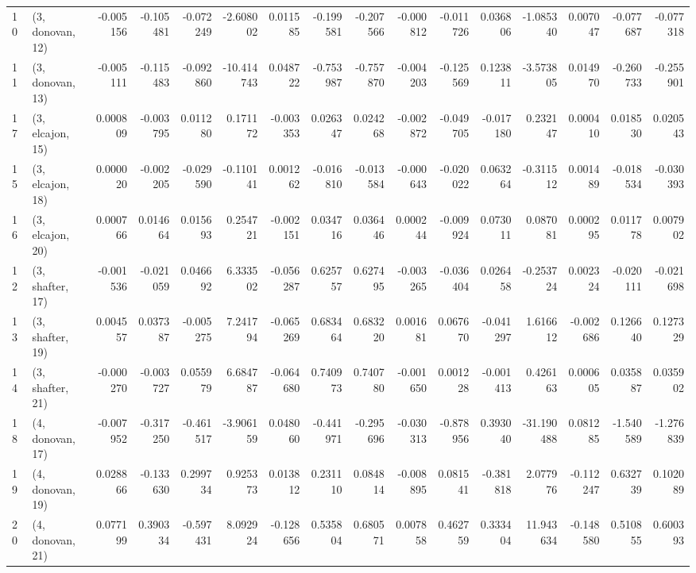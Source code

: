 \begin{tabular}{llrrrrrrrrrrrrrr}
10 &  (3, donovan, 12) &  -0.005156 & -0.105481 & -0.072249 &  -2.608002 &  0.011585 &  -0.199581 & -0.207566 & -0.000812 & -0.011726 &  0.036806 &  -1.085340 &  0.007047 & -0.077687 & -0.077318 \\
11 &  (3, donovan, 13) &  -0.005111 & -0.115483 & -0.092860 & -10.414743 &  0.048722 &  -0.753987 & -0.757870 & -0.004203 & -0.125569 &  0.123811 &  -3.573805 &  0.014970 & -0.260733 & -0.255901 \\
17 &  (3, elcajon, 15) &   0.000809 & -0.003795 &  0.011280 &   0.171172 & -0.003353 &   0.026347 &  0.024268 & -0.002872 & -0.049705 & -0.017180 &   0.232147 &  0.000410 &  0.018530 &  0.020543 \\
15 &  (3, elcajon, 18) &   0.000020 & -0.002205 & -0.029590 &  -0.110141 &  0.001262 &  -0.016810 & -0.013584 & -0.000643 & -0.020022 &  0.063264 &  -0.311512 &  0.001489 & -0.018534 & -0.030393 \\
16 &  (3, elcajon, 20) &   0.000766 &  0.014664 &  0.015693 &   0.254721 & -0.002151 &   0.034716 &  0.036446 &  0.000244 & -0.009924 &  0.073011 &   0.087081 &  0.000295 &  0.011778 &  0.007902 \\
12 &  (3, shafter, 17) &  -0.001536 & -0.021059 &  0.046692 &   6.333502 & -0.056287 &   0.625757 &  0.627495 & -0.003265 & -0.036404 &  0.026458 &  -0.253724 &  0.002324 & -0.020111 & -0.021698 \\
13 &  (3, shafter, 19) &   0.004557 &  0.037387 & -0.005275 &   7.241794 & -0.065269 &   0.683464 &  0.683220 &  0.001681 &  0.067670 & -0.041297 &   1.616612 & -0.002686 &  0.126640 &  0.127329 \\
14 &  (3, shafter, 21) &  -0.000270 & -0.003727 &  0.055979 &   6.684787 & -0.064680 &   0.740973 &  0.740780 & -0.001650 &  0.001228 & -0.001413 &   0.426163 &  0.000605 &  0.035887 &  0.035902 \\
18 &  (4, donovan, 17) &  -0.007952 & -0.317250 & -0.461517 &  -3.906159 &  0.048060 &  -0.441971 & -0.295696 & -0.030313 & -0.878956 &  0.393040 & -31.190488 &  0.081285 & -1.540589 & -1.276839 \\
19 &  (4, donovan, 19) &   0.028866 & -0.133630 &  0.299734 &   0.925373 &  0.013812 &   0.231110 &  0.084814 & -0.008895 &  0.081541 & -0.381818 &   2.077976 & -0.112247 &  0.632739 &  0.102089 \\
20 &  (4, donovan, 21) &   0.077199 &  0.390334 & -0.597431 &   8.092924 & -0.128656 &   0.535804 &  0.680571 &  0.007858 &  0.462759 &  0.333404 &  11.943634 & -0.148580 &  0.510855 &  0.600393 \\

\end{tabular}
